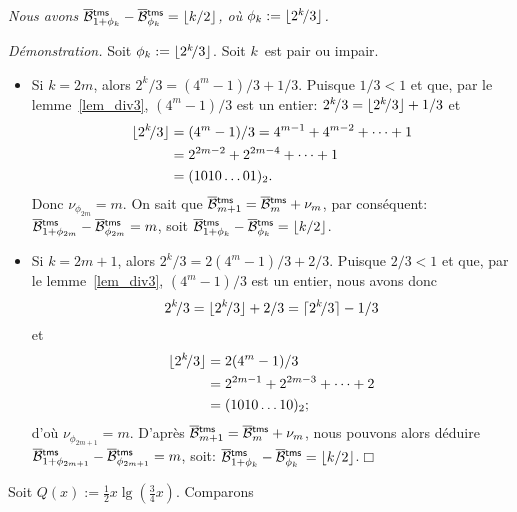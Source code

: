 \begin{thm}
\label{thm_OB_lambda}
\textsl{Nous avons \(\OB{\mathsf{tms}}{1+\phi_k} -
  \OB{\mathsf{tms}}{\phi_k} = \floor{k/2}\), où \(\phi_k :=
  \lfloor{2^k\!/3}\rfloor\).}
\end{thm}
\noindent \emph{Démonstration.} Soit \(\phi_k := \lfloor{2^k\!/3}\rfloor\). Soit
\(k\)~est pair ou impair.
\begin{itemize}

  \item Si \(k=2m\), alors \(2^k\!/3 = (4^m-1)/3 + 1/3\). Puisque
    \(1/3<1\) et que, par le lemme~\ref{lem_div3}, \((4^m-1)/3\) est un
    entier: \(2^k\!/3 = \lfloor{2^k\!/3}\rfloor + 1/3\) et
    \begin{align*}
      \lfloor{2^k\!/3}\rfloor &= (4^m-1)/3 = 4^{m-1} + 4^{m-2} + \dots + 1\\
                      &= 2^{2m-2} + 2^{2m-4} + \dots + 1\\
                      &= (1010\dots01)_2.
    \end{align*}
    Donc \(\nu_{\phi_{2m}} = m\). On sait que \(\OB{\fun{tms}}{m+1} =
    \OB{\fun{tms}}{m} + \nu_m\), par conséquent:
    \(\OB{\fun{tms}}{1+\phi_{2m}} - \OB{\fun{tms}}{\phi_{2m}} = m\),
    soit \(\OB{\fun{tms}}{1+\phi_k} - \OB{\fun{tms}}{\phi_k} =
    \floor{k/2}\).

  \item Si \(k=2m+1\), alors \(2^k\!/3 = 2(4^m\!-\!1)/3 + 2/3\). Puisque
    \(2/3\!<\!1\) et que, par le lemme~\ref{lem_div3},
    \((4^m-1)/3\) est un entier, nous avons donc
    \begin{equation*}
      2^k\!/3 = \lfloor{2^k\!/3}\rfloor + 2/3 = \lceil{2^k\!/3}\rceil - 1/3
    \end{equation*}
    et
    \begin{align*}
      \lfloor{2^k\!/3}\rfloor &= 2(4^m-1)/3\\
                      &= 2^{2m-1} + 2^{2m-3} + \dots + 2\\
                      &= (1010\dots10)_2;
    \end{align*}
    d'où \(\nu_{\phi_{2m+1}} = m\). D'après \(\OB{\fun{tms}}{m+1} =
    \OB{\fun{tms}}{m} + \nu_m\), nous pouvons alors déduire
    \(\OB{\fun{tms}}{1+\phi_{2m+1}} - \OB{\fun{tms}}{\phi_{2m+1}} =
    m\), soit:
    \(\OB{\fun{tms}}{1+\phi_k} - \OB{\fun{tms}}{\phi_k} =
    \floor{k/2}\).\hfill\(\Box\)

\end{itemize}
\noindent Soit \(Q(x) := \tfrac{1}{2}x\lg(\tfrac{3}{4}x)\).  Comparons

